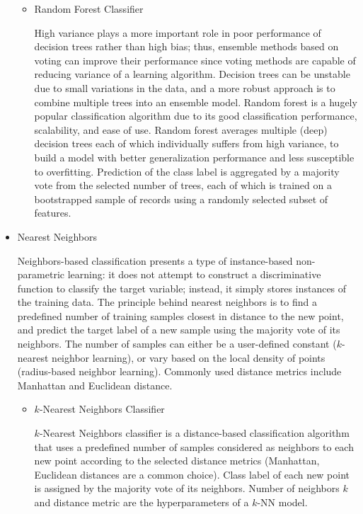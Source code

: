 \begin{itemize}
\begin{itemize}
        \item Random Forest Classifier

        High variance plays a more important role in poor performance of decision trees rather than high bias;
        thus, ensemble methods based on voting can improve their performance since voting methods are capable of reducing variance of a learning algorithm\cite{Dietterich1995}.
        Decision trees can be unstable due to small variations in the data, and a more robust approach is to combine multiple trees into an ensemble model.
        Random forest is a hugely popular classification algorithm due to its good classification performance, scalability, and ease of use\cite{RaschkaMirjalili2017}.
        Random forest averages multiple (deep) decision trees each of which individually suffers from high variance, to build a model with better generalization performance and less susceptible to overfitting.
        Prediction of the class label is aggregated by a majority vote from the selected number of trees, each of which is trained on a bootstrapped sample of records using a randomly selected subset of features.

    \end{itemize}

    \item Nearest Neighbors


    Neighbors-based classification presents a type of instance-based non-parametric learning: it does not attempt to construct a discriminative function to classify the target variable;
    instead, it simply stores instances of the training data.
    The principle behind nearest neighbors is to find a predefined number of training samples closest in distance to the new point, and predict the target label of a new sample using the majority vote of its neighbors.
    The number of samples can either be a user-defined constant ($k$-nearest neighbor learning), or vary based on the local density of points (radius-based neighbor learning).
    Commonly used distance metrics include Manhattan and Euclidean distance.

    \begin{itemize}

        \item $k$-Nearest Neighbors Classifier

        $k$-Nearest Neighbors classifier is a distance-based classification algorithm that uses a predefined number of samples considered as neighbors to each new point according to the selected distance metrics (Manhattan, Euclidean distances are a common choice).
        Class label of each new point is assigned by the majority vote of its neighbors.
        Number of neighbors $k$ and distance metric are the hyperparameters of a $k$-NN model.

    \end{itemize}

\end{itemize}

